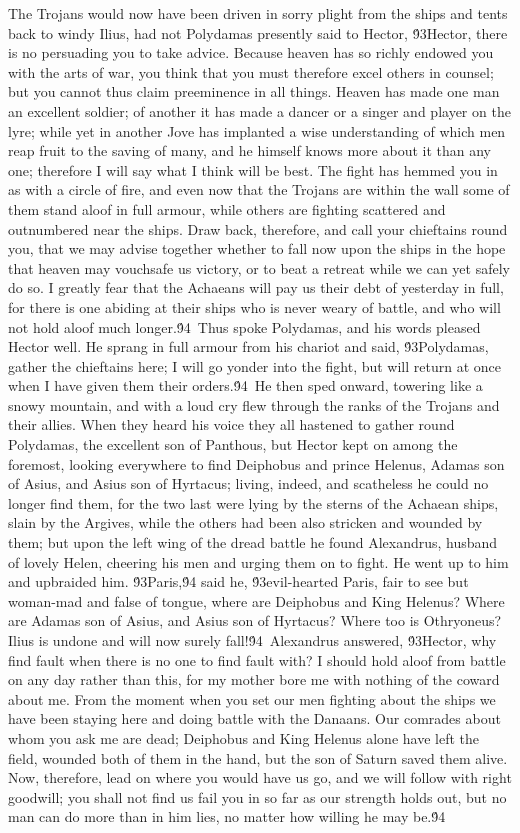 {The Trojans would now have been driven in sorry plight from the ships and tents back to windy Ilius, had not Polydamas presently said to Hector, \'93Hector, there is no persuading you to take advice. Because heaven has so richly endowed you with the arts of war, you think that you must therefore excel others in counsel; but you cannot thus claim preeminence in all things. Heaven has made one man an excellent soldier; of another it has made a dancer or a singer and player on the lyre; while yet in another Jove has implanted a wise understanding of which men reap fruit to the saving of many, and he himself knows more about it than any one; therefore I will say what I think will be best. The fight has hemmed you in as with a circle of fire, and even now that the Trojans are within the wall some of them stand aloof in full armour, while others are fighting scattered and outnumbered near the ships. Draw back, therefore, and call your chieftains round you, that we may advise together whether to fall now upon the ships in the hope that heaven may vouchsafe us victory, or to beat a retreat while we can yet safely do so. I greatly fear that the Achaeans will pay us their debt of yesterday in full, for there is one abiding at their ships who is never weary of battle, and who will not hold aloof much longer.\'94\
Thus spoke Polydamas, and his words pleased Hector well. He sprang in full armour from his chariot and said, \'93Polydamas, gather the chieftains here; I will go yonder into the fight, but will return at once when I have given them their orders.\'94\
He then sped onward, towering like a snowy mountain, and with a loud cry flew through the ranks of the Trojans and their allies. When they heard his voice they all hastened to gather round Polydamas, the excellent son of Panthous, but Hector kept on among the foremost, looking everywhere to find Deiphobus and prince Helenus, Adamas son of Asius, and Asius son of Hyrtacus; living, indeed, and scatheless he could no longer find them, for the two last were lying by the sterns of the Achaean ships, slain by the Argives, while the others had been also stricken and wounded by them; but upon the left wing of the dread battle he found Alexandrus, husband of lovely Helen, cheering his men and urging them on to fight. He went up to him and upbraided him. \'93Paris,\'94 said he, \'93evil-hearted Paris, fair to see but woman-mad and false of tongue, where are Deiphobus and King Helenus? Where are Adamas son of Asius, and Asius son of Hyrtacus? Where too is Othryoneus? Ilius is undone and will now surely fall!\'94\
Alexandrus answered, \'93Hector, why find fault when there is no one to find fault with? I should hold aloof from battle on any day rather than this, for my mother bore me with nothing of the coward about me. From the moment when you set our men fighting about the ships we have been staying here and doing battle with the Danaans. Our comrades about whom you ask me are dead; Deiphobus and King Helenus alone have left the field, wounded both of them in the hand, but the son of Saturn saved them alive. Now, therefore, lead on where you would have us go, and we will follow with right goodwill; you shall not find us fail you in so far as our strength holds out, but no man can do more than in him lies, no matter how willing he may be.\'94\
}
